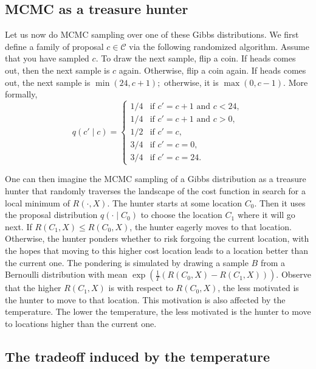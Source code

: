 \subsection{MCMC as a treasure hunter}

Let us now do MCMC sampling over one of these Gibbs distributions.
We first define a family of proposal $c \in \mathcal{C}$ via
the following randomized algorithm. Assume that you have sampled $c$. To
draw the next sample, flip a coin. If heads comes out, then the next sample
is $c$ again. Otherwise, flip a coin again. If heads comes out, the next sample is $\min(24, c + 1);$ otherwise, it is $\max(0, c - 1)$. More formally,
%
\begin{equation}
q(c' \mid c) =
\begin{cases}
1/4 & \text{if $c' = c + 1$ and $c < 24$},\\
1/4 & \text{if $c' = c + 1$ and $c > 0$},\\
1/2 & \text{if $c' = c$},\\
3/4 & \text{if $c' = c = 0$},\\
3/4 & \text{if $c' = c = 24$}.
\end{cases}
\end{equation}

One can then imagine the MCMC sampling of a Gibbs distribution as a
treasure hunter that randomly traverses the landscape of the cost function
in search for a local minimum of $R(\cdot, X)$. The hunter starts at some location $C_0$. Then it uses the proposal distribution $q(\cdot \mid C_0)$ to choose the location
$C_1$ where it will go next. If $R(C_1, X) \leq R(C_0, X)$, the hunter eagerly
moves to that location. Otherwise, the hunter ponders whether to risk
forgoing the current location, with the hopes that moving to this higher cost
location leads to a location better than the current one. The pondering
is simulated by drawing a sample $B$ from a Bernoulli distribution with
mean $\exp\left(\frac{1}{T}\left(R(C_0, X) - R(C_1, X)\right)\right)$. Observe that the higher $R(C_1, X)$
is with respect to $R(C_0, X)$, the less motivated is the hunter to move to
that location. This motivation is also affected by the temperature. The
lower the temperature, the less motivated is the hunter to move to locations
higher than the current one.

\subsection{The tradeoff induced by the temperature}


